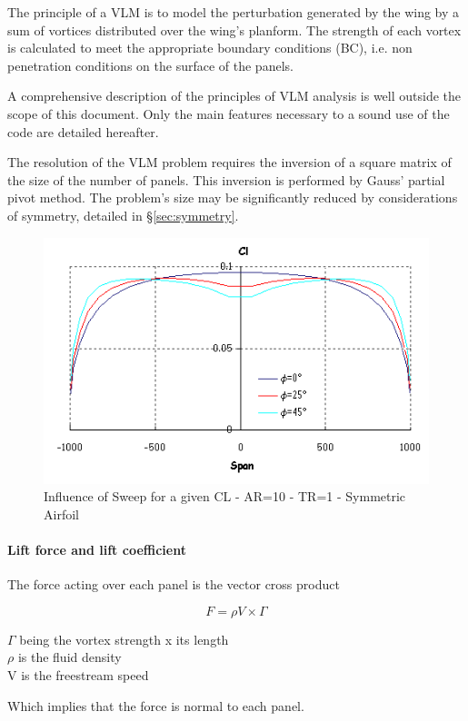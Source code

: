 \documentclass[a4paper,twoside,12pt,dvips]{article}
\begin{document}
The principle of a VLM is to model the perturbation generated by the
wing by a sum of vortices distributed over the wing's planform. The
strength of each vortex is calculated to meet the appropriate boundary
conditions (BC), i.e. non penetration conditions on the surface of the
panels.

A comprehensive description of the principles of VLM analysis is well
outside the scope of this document. Only the main features necessary
to a sound use of the code are detailed hereafter.

The resolution of the VLM problem requires the inversion of a square
matrix of the size of the number of panels. This inversion is
performed by Gauss' partial pivot method. The problem's size may be
significantly reduced by considerations of symmetry, detailed in
\S\ref{sec:symmetry}.

\begin{figure}[htbp]
  \includegraphics[width=0.8\linewidth]{img-17}\centering 
  \caption{Influence of Sweep for a given CL - AR=10 - TR=1 - Symmetric Airfoil}
  \label{fig:influence_of_sweep}
\end{figure}

\paragraph{Lift force and lift coefficient}

The force acting over each panel is the vector cross product

\[F = \rho V \times \Gamma \]

$\Gamma$ being the vortex strength x its length\\
$\rho$ is the fluid density\\
V is the freestream speed

Which implies that the force is normal to each panel.
\end{document}

